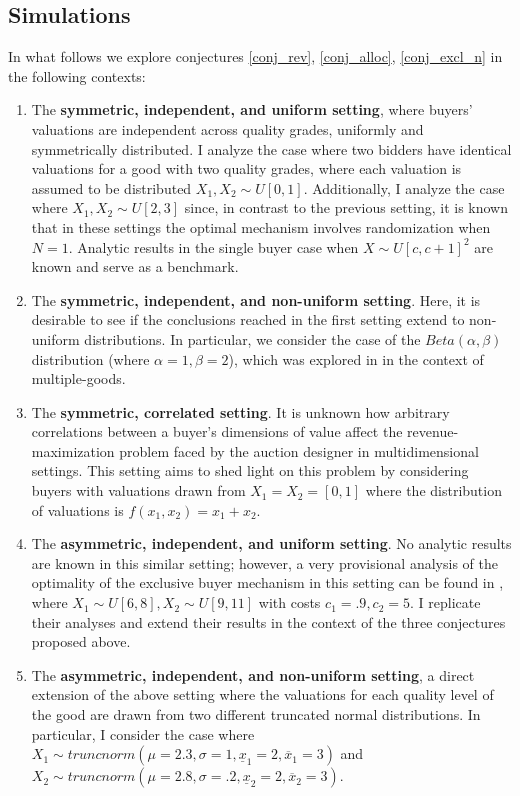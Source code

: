\documentclass{article}
\begin{document}
\subsection{Simulations}\label{subsec_sim}

In what follows we explore conjectures \ref{conj_rev}, \ref{conj_alloc}, \ref{conj_excl_n} in the following contexts:

\begin{enumerate}
    \item The \textbf{symmetric, independent, and uniform setting}, where buyers' valuations are independent across quality grades, uniformly and symmetrically distributed. I analyze the case where two bidders have identical valuations for a good with two quality grades, where each valuation is assumed to be distributed $X_1,X_2 \sim U[0,1]$. Additionally, I analyze the case where $X_1,X_2 \sim U[2,3]$ since, in contrast to the previous setting, it is known that in these settings the optimal mechanism involves randomization when $N=1$. Analytic results in the single buyer case when $X \sim U[c,c+1]^2$ are known \autocite{pavlov2011optimal} and serve as a benchmark.

    \item The \textbf{symmetric, independent, and non-uniform setting}. Here, it is desirable to see if the conclusions reached in the first setting extend to non-uniform distributions. In particular, we consider the case of the $Beta(\alpha,\beta)$ distribution (where $\alpha=1,\beta=2$), which was explored in \autocite{daskalakis2017strong} in the context of multiple-goods.  

    \item The \textbf{symmetric, correlated setting}. It is unknown how arbitrary correlations between a buyer's dimensions of value affect the revenue-maximization problem faced by the auction designer in multidimensional settings. This setting aims to shed light on this problem by considering buyers with valuations drawn from $X_1 = X_2 = [0,1]$ where the distribution of valuations is $f(x_1,x_2) = x_1 + x_2$.

    \item The \textbf{asymmetric, independent, and uniform setting}. No analytic results are known in this similar setting; however, a very provisional analysis of the optimality of the exclusive buyer mechanism in this setting can be found in \autocite{belloni2010multidimensional}, where $X_1 \sim U[6,8], X_2 \sim U[9,11]$ with costs $c_1 = .9, c_2 = 5$. I replicate their analyses and extend their results in the context of the three conjectures proposed above.

    \item The \textbf{asymmetric, independent, and non-uniform setting}, a direct extension of the above setting where the valuations for each quality level of the good are drawn from two different truncated normal distributions. In particular, I consider the case where $X_1 \sim truncnorm(\mu=2.3, \sigma=1, \underline{x}_1=2, \overline{x}_1=3)$ and $X_2 \sim truncnorm(\mu=2.8, \sigma=.2, \underline{x}_2=2, \overline{x}_2=3)$.
\end{enumerate}
\end{document}

